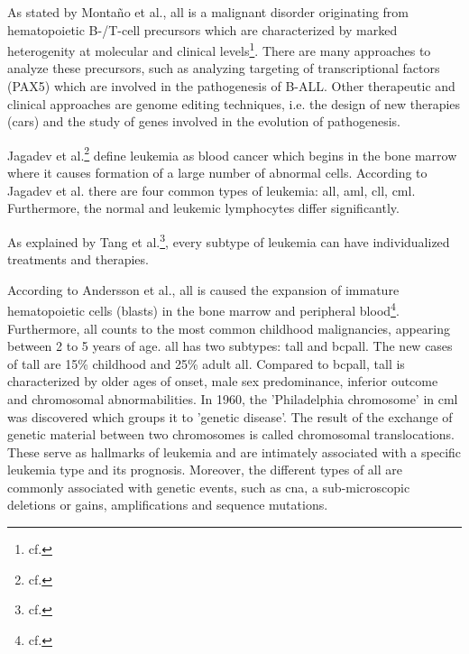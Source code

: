 As stated by Monta\~{n}o et al., \ac{all} is a malignant disorder originating from hematopoietic B-/T-cell precursors which are characterized by marked heterogenity at molecular and clinical levels\footnote{cf.\autocite{montano_2018}}. There are many approaches to analyze these precursors, such as analyzing targeting of transcriptional factors (PAX5) which are involved in the pathogenesis of B-ALL. Other therapeutic and clinical approaches are genome editing techniques, i.e. the design of new therapies (\ac{car}s) and the study of genes involved in the evolution of pathogenesis.

Jagadev et al.\footnote{cf.\autocite{jagadev}} define leukemia as blood cancer which begins in the bone marrow where it causes formation of a large number of abnormal cells. According to Jagadev et al. there are four common types of leukemia: \ac{all}, \ac{aml}, \ac{cll}, \ac{cml}. Furthermore, the normal and leukemic lymphocytes differ significantly.

As explained by Tang et al.\footnote{cf.\autocite{tang}}, every subtype of leukemia can have individualized treatments and therapies.

According to Andersson et al., \ac{all} is caused the expansion of immature hematopoietic cells (blasts) in the bone marrow and peripheral blood\footnote{cf.\autocite{andersson}}. Furthermore, \ac{all} counts to the most common childhood malignancies, appearing between 2 to 5 years of age. \ac{all} has two subtypes: \ac{tall} and \ac{bcpall}.
The new cases of \ac{tall} are 15\% childhood and 25\% adult \ac{all}. Compared to \ac{bcpall}, \ac{tall} is characterized by older ages of onset, male sex predominance, inferior outcome and chromosomal abnormabilities.
In 1960, the 'Philadelphia chromosome' in \ac{cml} was discovered which groups it to 'genetic disease'.
The result of the exchange of genetic material between two chromosomes is called chromosomal translocations. These serve as hallmarks of leukemia and are intimately associated with a specific leukemia type and its prognosis. Moreover, the different types of \ac{all} are commonly associated with genetic events, such as \ac{cna}, a sub-microscopic deletions or gains,  amplifications and sequence mutations.

